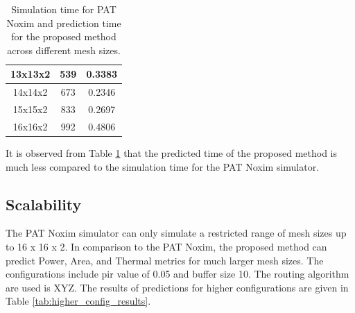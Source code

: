 \documentclass[conference]{IEEEtran}
\begin{document}
\begin{table}[h!]
\begin{tabular}{|c|c|c|}
		13x13x2            & 539                                     & 0.3383                                     \\ \hline
		14x14x2            & 673                                     & 0.2346                                     \\ \hline
		15x15x2            & 833                                     & 0.2697                                     \\ \hline
		16x16x2            & 992                                     & 0.4806                                     \\ \hline
	\end{tabular}
	\caption{Simulation time for PAT Noxim and prediction time for the proposed method across different mesh sizes.}
	\label{table:mesh_simulation_time}
\end{table}


It is observed from Table \ref{table:mesh_simulation_time} that the predicted time of the proposed method is much less compared to the simulation time for the PAT Noxim simulator.

\subsection{Scalability}
The PAT Noxim simulator can only simulate a restricted range of mesh sizes up to 16 x 16 x 2. In comparison to the PAT Noxim, the proposed method can predict Power, Area, and Thermal metrics for much larger mesh sizes.  The configurations include pir value of 0.05 and buffer size 10. The routing algorithm are used is XYZ. 
The results of predictions for higher configurations are given in Table \ref{tab:higher_config_results}. 
\end{document}
